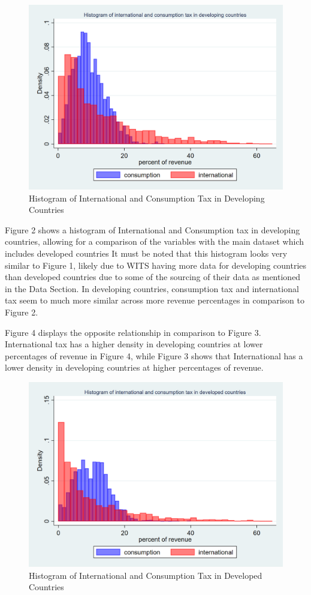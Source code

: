 \documentclass[12pt]{article}
\begin{document}
\begin{figure}[h]
    \centering
    \includegraphics[width=0.8\linewidth]{Reproducibility_Package//research_outputs/twowayhistdevelopingintcons.png}
    \caption{Histogram of International and Consumption Tax in Developing Countries}
    \label{fig:enter-label}
\end{figure}

Figure 2 shows a histogram of International and Consumption tax in developing countries, allowing for a comparison of the variables with the main dataset which includes developed countries It must be noted that this histogram looks very similar to Figure 1, likely due to WITS having more data for developing countries than developed countries due to some of the sourcing of their data as mentioned in the Data Section. In developing countries, consumption tax and international tax seem to much more similar across more revenue percentages in comparison to Figure 2. 

Figure 4 displays the opposite relationship in comparison to Figure 3. International tax has a higher density in developing countries at lower percentages of revenue in Figure 4, while Figure 3 shows that International has a lower density in developing countries at higher percentages of revenue. 

\begin{figure}[h]
    \centering
    \includegraphics[width=0.5\linewidth]{Reproducibility_Package//research_outputs/twowayhistdevelopedintcons.png}
    \caption{Histogram of International and Consumption Tax in Developed Countries}
    \label{fig:enter-label}
\end{figure}
\end{document}
